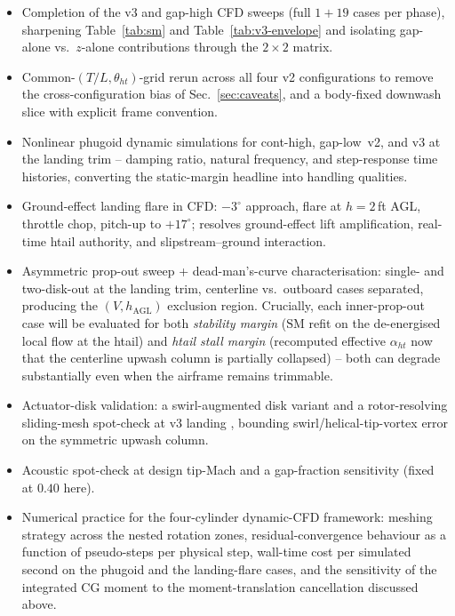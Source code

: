 \documentclass[conf]{new-aiaa}
\newcommand{\sm}{\mathrm{SM}}
\begin{document}
\begin{itemize}\setlength\itemsep{1pt}
  \item Completion of the v3 and gap-high CFD sweeps (full
        $1+19$ cases per phase), sharpening Table~\ref{tab:sm}
        and Table~\ref{tab:v3-envelope} and isolating
        gap-alone vs.\ $z$-alone contributions through the
        $2\times 2$ matrix.
  \item Common-$(T/L,\theta_{ht})$-grid rerun across all four
        v2 configurations to remove the cross-configuration
        bias of Sec.~\ref{sec:caveats}, and a body-fixed
        downwash slice with explicit frame convention.
  \item Nonlinear phugoid dynamic simulations for cont-high,
        gap-low~v2, and v3 at the landing trim -- damping
        ratio, natural frequency, and step-response time
        histories, converting the static-margin headline into
        handling qualities.
  \item Ground-effect landing flare in CFD: $-3^\circ$
        approach, flare at $h=2\,$ft AGL, throttle chop,
        pitch-up to $+17^\circ$; resolves ground-effect lift
        amplification, real-time htail authority, and
        slipstream--ground interaction.
  \item Asymmetric prop-out sweep + dead-man's-curve
        characterisation: single- and two-disk-out at the
        landing trim, centerline vs.\ outboard cases separated,
        producing the $(V, h_{\mathrm{AGL}})$ exclusion region.
        Crucially, each inner-prop-out case will be evaluated
        for both \emph{stability margin} ($\sm$ refit on the
        de-energised local flow at the htail) and \emph{htail
        stall margin} (recomputed effective $\alpha_{ht}$ now
        that the centerline upwash column is partially
        collapsed) -- both can degrade substantially even when
        the airframe remains trimmable.
  \item Actuator-disk validation: a swirl-augmented disk
        variant and a rotor-resolving sliding-mesh spot-check
        at v3 landing
        \cite{Jia2023RotorFundamentals,Jia2021TiltrotorDES},
        bounding swirl/helical-tip-vortex error on the
        symmetric upwash column.
  \item Acoustic spot-check at design tip-Mach and a gap-fraction
        sensitivity (fixed at $0.40$ here).
  \item Numerical practice for the four-cylinder dynamic-CFD
        framework: meshing strategy across the nested rotation
        zones, residual-convergence behaviour as a function of
        pseudo-steps per physical step, wall-time cost per
        simulated second on the phugoid and the landing-flare
        cases, and the sensitivity of the integrated CG moment
        to the moment-translation cancellation discussed above.
\end{itemize}
\end{document}
